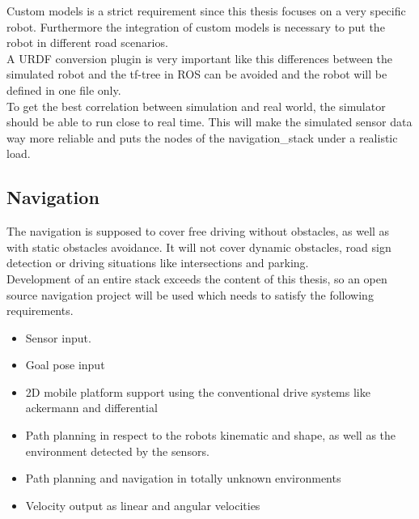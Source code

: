 Custom models is a strict requirement since this thesis focuses on a very specific robot. Furthermore the integration of custom models is necessary to put the robot in different road scenarios.\\

A URDF conversion plugin is very important like this differences between the simulated robot and the tf-tree in ROS can be avoided and the robot will be defined in one file only.\\

To get the best correlation between simulation and real world, the simulator should be able to run close to real time. This will make the simulated sensor data way more reliable and puts the nodes of the navigation\_stack under a realistic load.

\subsection{Navigation}
The navigation is supposed to cover free driving without obstacles, as well as with static obstacles avoidance. It will not cover dynamic obstacles, road sign detection or driving situations like intersections and parking.\\

Development of an entire stack exceeds the content of this thesis, so an open source navigation project will be used which needs to satisfy the following requirements.
\begin{itemize}
	\item Sensor input.
	\item Goal pose input
	\item 2D mobile platform support using the conventional drive systems like ackermann and differential
	\item Path planning in respect to the robots kinematic and shape, as well as the environment detected by the sensors.
	\item Path planning and navigation in totally unknown environments
	\item Velocity output as linear and angular velocities
\end{itemize}

